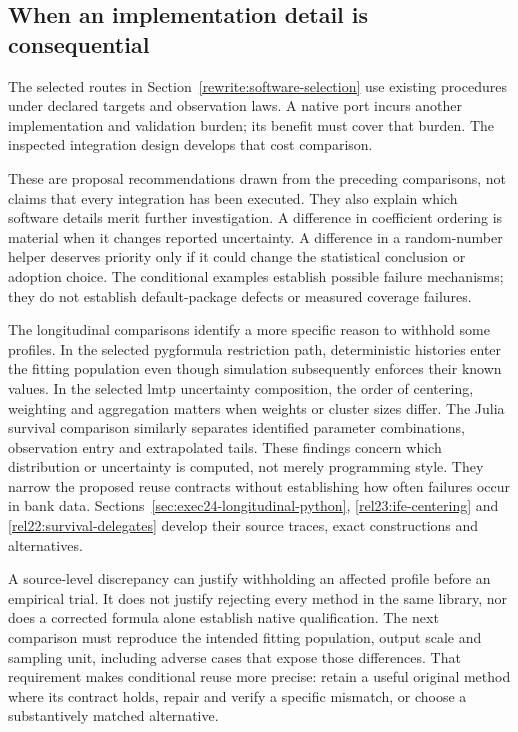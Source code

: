 \subsection{When an implementation detail is consequential}
The selected routes in Section~\ref{rewrite:software-selection} use existing
procedures under declared targets and observation laws. A native port incurs
another implementation and validation burden; its benefit must cover that
burden. The inspected integration design develops that cost comparison.
\citep{exec16_s10_design}

These are proposal recommendations drawn from the preceding comparisons, not
claims that every integration has been executed. They also explain which
software details merit further investigation. A difference in coefficient
ordering is material when it changes reported uncertainty. A difference in a
random-number helper deserves priority only if it could change the statistical
conclusion or adoption choice. The conditional examples establish possible
failure mechanisms; they do not establish default-package defects or measured
coverage failures.~\citep{exec29_panel_inference_sources,exec29_panel_runtime_reference}

The longitudinal comparisons identify a more specific reason to withhold
some profiles. In the selected pygformula restriction path, deterministic
histories enter the fitting population even though simulation subsequently
enforces their known values. In the selected lmtp uncertainty composition,
the order of centering, weighting and aggregation matters when weights or
cluster sizes differ. The Julia survival comparison similarly separates
identified parameter combinations, observation entry and extrapolated tails.
These findings concern which distribution or uncertainty is computed, not
merely programming style. They narrow the proposed reuse contracts without
establishing how often failures occur in bank data.
Sections~\ref{sec:exec24-longitudinal-python}, \ref{rel23:ife-centering} and
\ref{rel22:survival-delegates} develop their source traces, exact constructions
and alternatives.~\citep{rel25pygfit,rel23ife,rel23ifecaller,rel22survbase,rel22survdist,rel22survcaller}

A source-level discrepancy can justify withholding an affected profile before
an empirical trial. It does not justify rejecting every method in the same
library, nor does a corrected formula alone establish native qualification.
The next comparison must reproduce the intended fitting population, output
scale and sampling unit, including adverse cases that expose those differences.
That requirement makes conditional reuse more precise: retain a useful original
method where its contract holds, repair and verify a specific mismatch, or
choose a substantively matched alternative.

